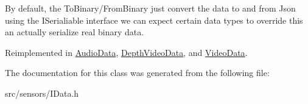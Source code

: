 By default, the To\+Binary/\+From\+Binary just convert the data to and from Json using the I\+Serialiable interface we can expect certain data types to override this an actually serialize real binary data. 

Reimplemented in \hyperlink{class_audio_data_a1cc9349b5edf80a5e0b35e6eb5cb3045}{Audio\+Data}, \hyperlink{class_depth_video_data_a0902f7a270581cd84d79866f0273680e}{Depth\+Video\+Data}, and \hyperlink{class_video_data_a452a7f7290e463b02513ba4f1b08c3b7}{Video\+Data}.



The documentation for this class was generated from the following file\+:\begin{DoxyCompactItemize}
\item 
src/sensors/I\+Data.\+h\end{DoxyCompactItemize}
